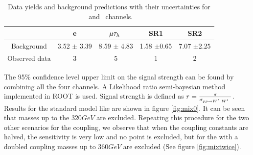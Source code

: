 \begin{table}[htb]
	\centering
	\begin{tabular}{|c|c|c|c|c|}
		\hline 
		  &e\Tau &  $\mu\tau_h~$ & \tauTau SR1 & \tauTau SR2 \\
		\hline 
	         Background &3.52 $\pm$ 3.39 &8.59 $\pm$ 4.83 &1.58 $\pm$0.65 &7.07 $\pm2.25$ \\     
		 Observed data& 3&5&1&2\\
		
		\hline
	\end{tabular}
	\caption{Data yields and background predictions with their uncertainties for \lepTau ~and \tauTau ~channels. \label{tab:yields} }
\end{table}

The 95\% confidence level upper limit on the signal strength can be found by combining all the four channels. A Likelihood ratio semi-bayesian method implemented in ROOT \cite{Brun:1997pa} is used. Signal strength is defined as $r = \frac{ \sigma }{\sigma_{pp \to W^\prime~W^\prime~} }$. Results for the standard model like \wprime are shown in figure  \ref{fig:mix0}. It can be seen that \wprime masses up to the $320GeV$ are excluded.  Repeating this procedure for the two other scenarios for the coupling, we observe that when the coupling constants are halved, the sensitivity is very low and no point is excluded, but for the \wprime with a doubled coupling masses up to $360GeV$ are excluded (See figure \ref{fig:mixtwice}).


